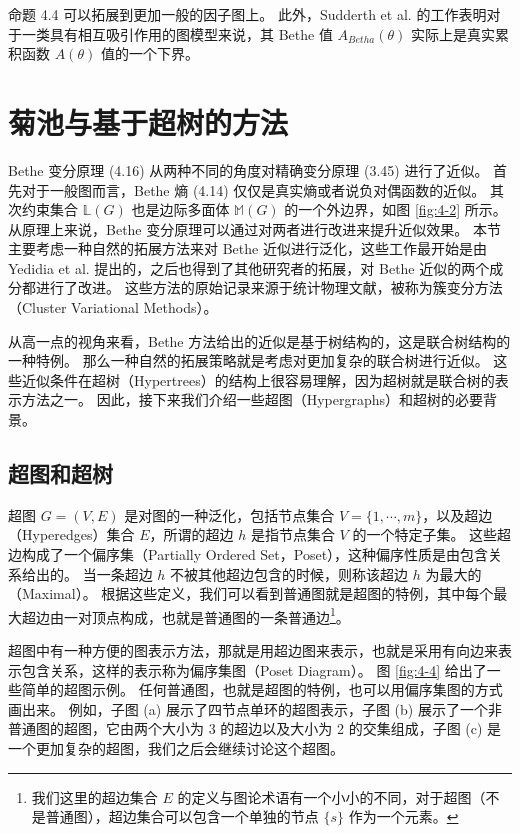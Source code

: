命题 4.4 可以拓展到更加一般的因子图上。
此外，Sudderth et al. 的工作表明对于一类具有相互吸引作用的图模型来说，其 Bethe 值 $A_{Betha}(\theta)$ 实际上是真实累积函数 $A(\theta)$ 值的一个下界。

\section{菊池与基于超树的方法}

Bethe 变分原理 (4.16) 从两种不同的角度对精确变分原理 (3.45) 进行了近似。
首先对于一般图而言，Bethe 熵 (4.14) 仅仅是真实熵或者说负对偶函数的近似。
其次约束集合 $\mathbb{L}(G)$ 也是边际多面体 $\mathbb{M}(G)$ 的一个外边界，如图 \ref{fig:4-2} 所示。
从原理上来说，Bethe 变分原理可以通过对两者进行改进来提升近似效果。
本节主要考虑一种自然的拓展方法来对 Bethe 近似进行泛化，这些工作最开始是由 Yedidia et al. 提出的，之后也得到了其他研究者的拓展，对 Bethe 近似的两个成分都进行了改进。
这些方法的原始记录来源于统计物理文献，被称为簇变分方法（Cluster Variational Methods）。

从高一点的视角来看，Bethe 方法给出的近似是基于树结构的，这是联合树结构的一种特例。
那么一种自然的拓展策略就是考虑对更加复杂的联合树进行近似。
这些近似条件在超树（Hypertrees）的结构上很容易理解，因为超树就是联合树的表示方法之一。
因此，接下来我们介绍一些超图（Hypergraphs）和超树的必要背景。

\subsection{超图和超树}

超图 $G = (V, E)$ 是对图的一种泛化，包括节点集合 $V = \{1, \cdots, m\}$，以及超边（Hyperedges）集合 $E$，所谓的超边 $h$ 是指节点集合 $V$ 的一个特定子集。
这些超边构成了一个偏序集（Partially Ordered Set，Poset），这种偏序性质是由包含关系给出的。
当一条超边 $h$ 不被其他超边包含的时候，则称该超边 $h$ 为最大的（Maximal）。
根据这些定义，我们可以看到普通图就是超图的特例，其中每个最大超边由一对顶点构成，也就是普通图的一条普通边\footnote{
    我们这里的超边集合 $E$ 的定义与图论术语有一个小小的不同，对于超图（不是普通图），超边集合可以包含一个单独的节点 $\{s\}$ 作为一个元素。
}。

超图中有一种方便的图表示方法，那就是用超边图来表示，也就是采用有向边来表示包含关系，这样的表示称为偏序集图（Poset Diagram）。
图 \ref{fig:4-4} 给出了一些简单的超图示例。
任何普通图，也就是超图的特例，也可以用偏序集图的方式画出来。
例如，子图 (a) 展示了四节点单环的超图表示，子图 (b) 展示了一个非普通图的超图，它由两个大小为 3 的超边以及大小为 2 的交集组成，子图 (c) 是一个更加复杂的超图，我们之后会继续讨论这个超图。

